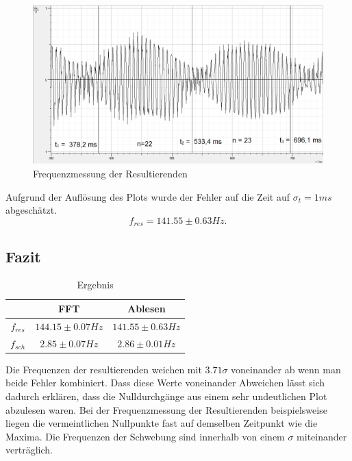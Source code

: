 \documentclass[12pt,a4paper]{article}
\begin{document}
\begin{figure}[H]
\centering
\includegraphics[scale=0.5]{schwebung/Schwebung_zaehlen_2.png}
\caption{Frequenzmessung der Resultierenden}
\end{figure}
Aufgrund der Auflösung des Plots wurde der Fehler auf die  Zeit auf $\sigma_t=1ms$ abgeschätzt.
\begin{equation}
f_{res}=141.55 \pm 0.63Hz.
\end{equation}

\subsection{Fazit}

\begin{table}[H]\centering
\caption{Ergebnis}
\begin{tabular}{c|cc} 
 & FFT & Ablesen \\ 
\hline
$f_{res}$ & $144.15 \pm 0.07 Hz$
 & $141.55 \pm 0.63 Hz$ \\ 
$f_{sch}$ & $2.85 \pm 0.07 Hz$ & $2.86 \pm 0.01 Hz$ \\ 
\end{tabular}
\end{table}
 
Die Frequenzen der resultierenden weichen mit $3.71 \sigma$ voneinander ab wenn man beide Fehler kombiniert. Dass diese Werte voneinander Abweichen lässt sich dadurch erklären, dass die Nulldurchgänge aus einem sehr undeutlichen Plot abzulesen waren. Bei der Frequenzmessung der Resultierenden beispielsweise liegen die vermeintlichen Nullpunkte fast auf demselben Zeitpunkt wie die Maxima. \newline Die Frequenzen der Schwebung sind innerhalb von einem $\sigma$ miteinander verträglich. 
\end{document}
